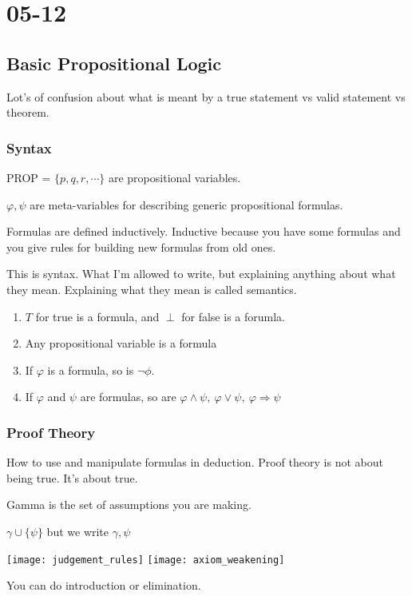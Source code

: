 \documentclass[../598comp.tex]{subfiles}
\date{05-12}
\begin{document}
\section{05-12}

\subsection{Basic Propositional Logic}

Lot's of confusion about what is meant by a true statement vs valid statement vs theorem.

\subsubsection{Syntax}
PROP = $\{p, q, r, \cdots\}$ are propositional variables.

$\varphi, \psi$ are meta-variables for describing generic propositional formulas.

Formulas are defined inductively. Inductive because you have some formulas and
you give rules for building new formulas from old ones.

This is syntax. What I'm allowed to write, but explaining anything about what
they mean. Explaining what they mean is called semantics.
\begin{enumerate}
\item 
  $T$ for true is a formula, and $\perp$ for false is a forumla.
\item
  Any propositional variable is a formula
\item
  If $\varphi$ is a formula, so is $\neg \phi$.
\item
  If $\varphi$ and $\psi$ are formulas, so are $\varphi \wedge \psi, \ \varphi
  \vee \psi, \ \varphi \Rightarrow \psi$
\end{enumerate}

\subsubsection{Proof Theory}
How to use and manipulate formulas in deduction. Proof theory is not about being
true. It's about true.

Gamma is the set of assumptions you are making.

$\gamma \cup \{\psi\}$ but we write $\gamma, \psi$

\texttt{[image: judgement\_rules]}
\texttt{[image: axiom\_weakening]}

You can do introduction or elimination.
\end{document}
